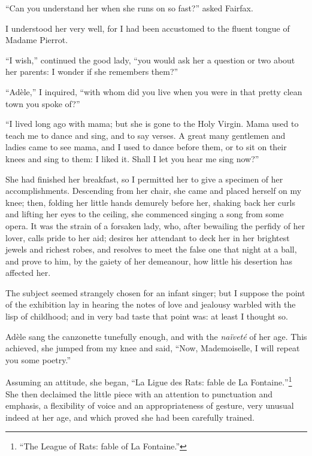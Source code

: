 \enquote{Can you understand her when she runs on so fast?} asked \Mrs{}
Fairfax.

I understood her very well, for I had been accustomed to the fluent
tongue of Madame Pierrot.

\enquote{I wish,} continued the good lady, \enquote{you would ask her a
	question or two about her parents: I wonder if she remembers them?}

\enquote{Adèle,} I inquired, \enquote{with whom did you live when you
	were in that pretty clean town you spoke of?}

\enquote{I lived long ago with mama; but she is gone to the Holy
	Virgin. Mama used to teach me to dance and sing, and to say verses. A
	great many gentlemen and ladies came to see mama, and I used to dance
	before them, or to sit on their knees and sing to them: I liked it.
	Shall I let you hear me sing now?}

She had finished her breakfast, so I permitted her to give a specimen of
her accomplishments. Descending from her chair, she came and placed
herself on my knee; then, folding her little hands demurely before her,
shaking back her curls and lifting her eyes to the ceiling, she
commenced singing a song from some opera. It was the strain of a
forsaken lady, who, after bewailing the perfidy of her lover, calls
pride to her aid; desires her attendant to deck her in her brightest
jewels and richest robes, and resolves to meet the false one that night
at a ball, and prove to him, by the gaiety of her demeanour, how little
his desertion has affected her.

The subject seemed strangely chosen for an infant singer; but I suppose
the point of the exhibition lay in hearing the notes of love and
jealousy warbled with the lisp of childhood; and in very bad taste that
point was: at least I thought so.

Adèle sang the canzonette tunefully enough, and with the \emph{naïveté}
of her age. This achieved, she jumped from my knee and said,
\enquote{Now, Mademoiselle, I will repeat you some poetry.}

Assuming an attitude, she began, \foreignquote{french}{La Ligue des Rats: fable de La
	Fontaine.}\footnote{\enquote{The League of Rats: fable of La Fontaine.}} %
She then declaimed the little piece with an attention to
punctuation and emphasis, a flexibility of voice and an appropriateness
of gesture, very unusual indeed at her age, and which proved she had
been carefully trained.


